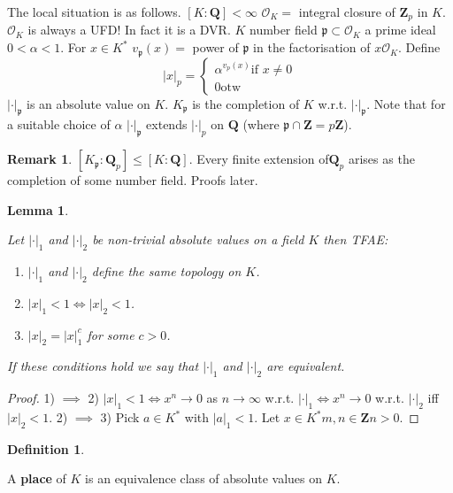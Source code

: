 \documentclass[10pt,]{book}
\newcommand{\lt}{<}
\newcommand{\gt}{>}
\newcommand{\terminology}[1]{\textbf{#1}}
\theoremstyle{plain}
\newtheorem{lemma}[theorem]{Lemma}
\theoremstyle{definition}
\newtheorem{definition}[theorem]{Definition}
\newtheorem{remark}[theorem]{Remark}
\newcommand{\QQ}{\mathbf{Q}}
\newcommand{\ZZ}{\mathbf{Z}}
\newcommand{\cO}{\mathcal{O}}
\newcommand{\fp}{\mathfrak{p}}
\newcommand{\ab}{|\cdot|}
\begin{document}
        The local situation is as follows.
        \([K: \QQ] \lt \infty  \) \(\cO_K = \) integral closure of \(\ZZ_p\) in \(K\).
        \(\cO_K\) is always a UFD! In fact it is a DVR.
        \(K\) number field \(\fp \subset\cO_K\) a prime ideal \(0\lt \alpha\lt 1\).
        For \(x\in K^*\) \(v_{\fp}(x) = \) power of \(\fp\) in the factorisation of \(x\cO_K\).
        Define \[|x|_p = \begin{cases} \alpha^{v_p(x)} \text{if } x\ne 0\\0 \text{otw}\end{cases}\]
        \(\ab_{\fp}\) is an absolute value on \(K\).
        \(K_{\fp}\) is the completion of \(K\) w.r.t. \(\ab_{\fp}\).
        Note that for a suitable choice of \(\alpha\) \(\ab_{\fp}\) extends \(\ab_p\) on \(\QQ\) (where \(\fp \cap \ZZ = p\ZZ\)).
\begin{remark}\label{remark-2}
\([K_{\fp} : \QQ_p] \le [K: \QQ]\).
          Every finite extension of\(\QQ_p\) arises as the completion of some number field.
          Proofs later.
        \end{remark}
\begin{lemma}\label{lemma-3}

          Let \(\ab_1\) and \(\ab_2\) be non-trivial absolute values on a field \(K\) then TFAE:
          \begin{enumerate}
\item{}\(\ab_1\) and \(\ab_2\) define the same topology on \(K\).\item{}\(|x|_1\lt 1 \iff |x|_2 \lt 1\).\item{}\(|x|_2 = |x|_1^c\) for some \(c \gt 0\).\end{enumerate}

          If these conditions hold we say that \(\ab_1\) and \(\ab_2\) are equivalent.
        \end{lemma}
\begin{proof}

          1) \(\implies\) 2) \(|x|_1 \lt 1 \iff x^n \to 0\) as \(n \to \infty\) w.r.t. \(\ab_1 \iff x^n \to 0\) w.r.t. \(\ab_2\) iff \(|x|_2 \lt 1\).\newline{}
          2) \(\implies\) 3) Pick \(a \in K^*\) with \(|a|_1 \lt 1\).
          Let \(x\in K^*\)\(m,n\in \ZZ\)\(n \gt 0\).
          \end{proof}
\begin{definition}\label{definition-5}

          A \terminology{place} of \(K\) is an equivalence class of absolute values on \(K\).
        \end{definition}
\end{document}
